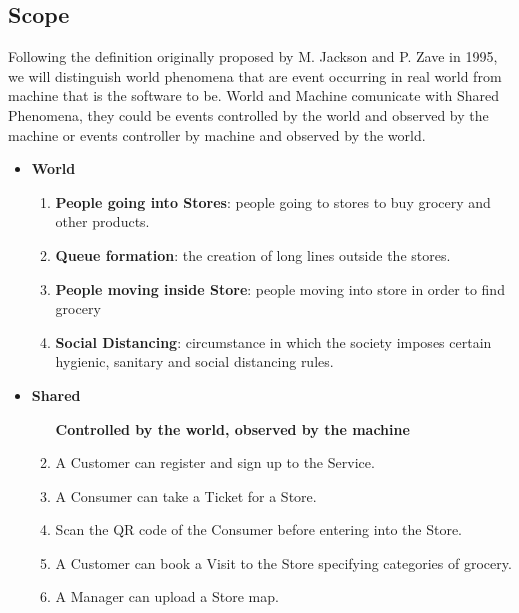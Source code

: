 \documentclass[a4paper, 12pt, oneside]{article}
\begin{document}
\pagebreak

\subsection{Scope}

\begin{flushleft}
Following the definition originally proposed by M. Jackson and P. Zave in 1995,
we will distinguish world phenomena that are event occurring in real world from machine
that is the software to be.
World and Machine comunicate with Shared Phenomena, they could be events controlled by the world and observed by the machine or events controller by machine and observed by the world.
\end{flushleft}

\begin{itemize}
    \item {\large \textbf{World}}
    \begin{enumerate}[label={S.W.\arabic{*}}]
        \item \textbf{People going into Stores}: people going to stores to buy grocery and other products.
        \item \textbf{Queue formation}: the creation of long lines outside the stores.
        \item \textbf{People moving inside Store}: people moving into store in order to find grocery
        \item \textbf{Social Distancing}: circumstance in which the society imposes certain hygienic, sanitary and social distancing rules.
    \end{enumerate}
    \item {\large \textbf{Shared}}
    
    
    \begin{enumerate}[label={S.S.\arabic{*}}, align=left]
        \item[\textbf{Controlled by the world, observed by the machine}]
         \item \label{shared:registration} A Customer can register and sign up to the Service.
        \item \label{shared:getTicket} A Consumer can take a Ticket for a Store.
        \item \label{shared:scanQR}Scan the QR code of the Consumer before entering into the Store.
        \item \label{shared:bookVisit} A Customer can book a Visit to the Store specifying categories of grocery.
        \item \label{shared:uploadMap} A Manager can upload a Store map.
       

\end{enumerate}
\end{itemize}
\end{document}
